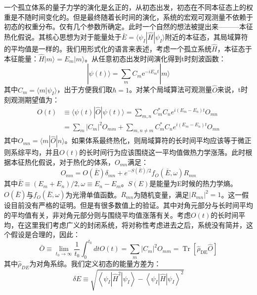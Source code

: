 一个孤立体系的量子力学的演化是幺正的，从初态出发，初态在不同本征态上的权重是不随时间变化的。但是最终随着长时间的演化，系统的宏观可观测量不依赖于初态的权重分布。仅有几个参数所确定。此时一个自然的想法被提出来———本征热化假说\cite{Deutsch1991quantum,Srednicki1994chaos,srednicki1999approach}。其核心思想为对于能量处于$\bar{E}=\langle\psi_I|\hat{H}|\psi_I\rangle$附近的本征态，其局域算符的平均值是一样的。我们用形式化的语言来表述，考虑一个孤立系统$\hat{H}$，本征态于本征能量：$\hat{H}|m\rangle=E_m|m\rangle$。从任意初态出发时间演化得到t时刻波函数：
\begin{equation}
|\psi(t)\rangle=\sum_{m} C_{m} \mathrm{e}^{-i E_{m} t}|m\rangle
\end{equation}
其中$C_m = \langle m | \psi_I\rangle$，出于方便我们取$\hbar=1$。对某个局域算法可观测量$\hat{O}$来说，t时刻观测期望值为：
\begin{equation}
\begin{aligned}
O(t) & \equiv\langle\psi(t)|\hat{O}| \psi(t)\rangle=\sum_{m, n} C_{m}^{*} C_{n} e^{i\left(E_{m}-E_{n}\right) t} O_{m n} \\
&=\sum_{m}\left|C_{m}\right|^{2} O_{m m}+\sum_{m, n \neq m} C_{m}^{*} C_{n} e^{i\left(E_{m}-E_{n}\right) t} O_{m n}
\end{aligned}
\end{equation}
其中$O_{m n}=\langle m|\hat{O}| n\rangle$。如果体系最终热化，则局域算符的长时间平均应该等于微正则系综平均，并且$O(t)$的长时间行为应该围绕这一平均值做热力学涨落。此时根据本征热化假说，对于热化的体系，$O_{mn}$满足：
\begin{equation}
O_{m n}=O(\bar{E}) \delta_{m n}+e^{-S(\bar{E}) / 2} f_{O}(\bar{E}, \omega) R_{m n}
\end{equation}
其中$\bar{E} \equiv\left(E_{m}+E_{n}\right) / 2, \omega \equiv E_{n}-E_{m}$。$S(E)$是能量为E时候的热力学熵。$O(\bar{E})$与$f_{O}(\bar{E}, \omega)$为光滑单值函数。$R_{m n}$为随机变量，满足$\overline{\left|R_{m n}\right|^{2}}=1$。这一假设目前没有严格的证明。但是有很多数值上的验证。其中对角元部分与长时间平均的平均值有关，非对角元部分则与围绕平均值涨落有关。考虑$O(t)$的长时间平均，在这里我们考虑广义的封闭系统，将对称性考虑进去之后，系统没有简并，这个假设是合理的，因此：
\begin{equation}
\bar{O} \equiv \lim _{t_{0} \rightarrow \infty} \frac{1}{t_{0}} \int_{0}^{t_{0}} d t O(t)=\sum_{m}\left|C_{m}\right|^{2} O_{m m}=\operatorname{Tr}\left[\hat{\rho}_{\mathrm{DE}} \hat{O}\right]
\end{equation}
其中$\hat{\rho}_{DE}$为对角系综。我们定义初态的能量方差为：
\begin{equation}
\delta E \equiv \sqrt{\left\langle\psi_{I}\left|\hat{H}^{2}\right| \psi_{I}\right\rangle-\left\langle\psi_{I}|\hat{H}| \psi_{I}\right\rangle^{2}}
\end{equation}
